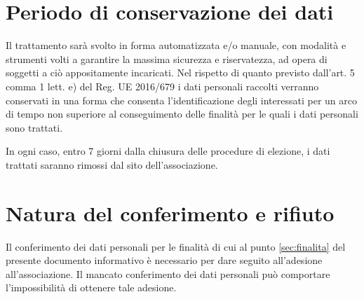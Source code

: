 \documentclass[legalpaper, 11pt]{exam}
\let\tempone\enumerate
\let\temptwo\endenumerate
\renewenvironment{enumerate}{\tempone\addtolength{\itemsep}{-0.45\baselineskip}}{\temptwo}
\begin{document}
{\section{Periodo di conservazione dei dati}
\begin{enumerate}
	\item Il trattamento sarà svolto in forma automatizzata e/o manuale, con modalità e strumenti volti a garantire la massima sicurezza e riservatezza, ad opera di soggetti a ciò appositamente incaricati.
	Nel rispetto di quanto previsto dall’art. 5 comma 1 lett. e) del Reg. UE 2016/679 i dati personali raccolti verranno conservati in una forma che consenta l’identificazione degli interessati per un arco di tempo non superiore al conseguimento delle finalità per le quali i dati personali sono trattati.
	\item In ogni caso, entro 7 giorni dalla chiusura delle procedure di elezione, i dati trattati saranno rimossi dal sito dell'associazione.
\end{enumerate}



\section{Natura del conferimento e rifiuto}
Il conferimento dei dati personali per le finalità di cui al punto \ref{sec:finalita} del presente documento informativo è necessario per dare seguito all’adesione all’associazione. Il mancato conferimento dei dati personali può comportare l’impossibilità di ottenere tale adesione.

}
\end{document}
